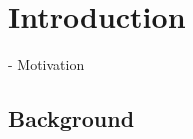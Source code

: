
\chapter{Introduction}
\label{introduction}
- Motivation
%
%

\section{Background}
\label{background}

